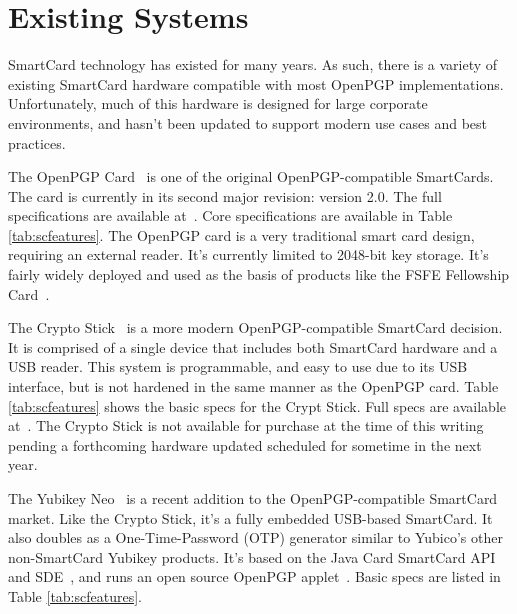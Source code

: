 \documentclass[11pt, twocolumn]{article}
\begin{document}
\section{Existing Systems}
\label{sec:exisitng}

SmartCard technology has existed for many years. As such, there is a
variety of existing SmartCard hardware compatible with most OpenPGP
implementations. Unfortunately, much of this hardware is designed for
large corporate environments, and hasn't been updated to support
modern use cases and best practices.

The OpenPGP Card~\cite{openpgpcard} is one of the original
OpenPGP-compatible SmartCards. The card is currently in its second
major revision: version 2.0. The full specifications are available
at~\cite{openpgpcard-doc-2.0}. Core specifications are available in
Table \ref{tab:scfeatures}. The OpenPGP card is a very traditional
smart card design, requiring an external reader. It's currently
limited to 2048-bit key storage. It's fairly widely deployed and used
as the basis of products like the FSFE Fellowship
Card~\cite{fellowshipcard}.

The Crypto Stick~\cite{cryptostick} is a more modern
OpenPGP-compatible SmartCard decision. It is comprised of a single
device that includes both SmartCard hardware and a USB reader. This
system is programmable, and easy to use due to its USB interface, but
is not hardened in the same manner as the OpenPGP card. Table
\ref{tab:scfeatures} shows the basic specs for the Crypt Stick. Full
specs are available at~\cite{cryptostick-wiki}. The Crypto Stick is
not available for purchase at the time of this writing pending a
forthcoming hardware updated scheduled for sometime in the next year.

The Yubikey Neo~\cite{yubikeyneo-openpgp-blog} is a recent addition to
the OpenPGP-compatible SmartCard market. Like the Crypto Stick, it's a
fully embedded USB-based SmartCard. It also doubles as a
One-Time-Password (OTP) generator similar to Yubico's other
non-SmartCard Yubikey products. It's based on the Java Card SmartCard
API and SDE~\cite{javacard}, and runs an open source OpenPGP
applet~\cite{yubikeyneo-openpgp-repo}. Basic specs are listed in Table
\ref{tab:scfeatures}.
\end{document}
